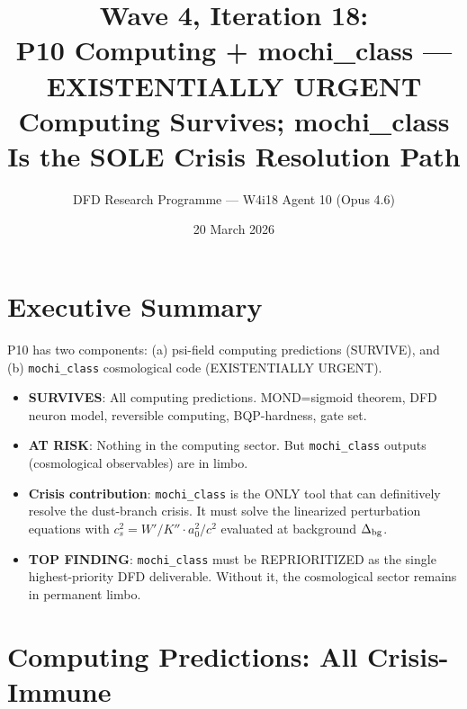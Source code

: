 \documentclass[11pt]{article}
\title{\textbf{Wave 4, Iteration 18:}\\
\textbf{P10 Computing + mochi\_class --- EXISTENTIALLY URGENT}\\[6pt]
{\large Computing Survives; mochi\_class Is the SOLE Crisis Resolution Path}}
\author{DFD Research Programme --- W4i18 Agent 10 (Opus 4.6)}
\date{20 March 2026}
\begin{document}
\maketitle

\section*{Executive Summary}

\begin{tcolorbox}[colback=red!5!white, colframe=red!70!black,
  title=\textbf{W4i18: P10 COMPUTING SURVIVES --- mochi\_class EXISTENTIALLY URGENT}]

P10 has two components: (a) psi-field computing predictions (SURVIVE),
and (b) \texttt{mochi\_class} cosmological code (EXISTENTIALLY URGENT).

\begin{itemize}
\item \textbf{SURVIVES}: All computing predictions. MOND=sigmoid theorem,
  DFD neuron model, reversible computing, BQP-hardness, gate set.
\item \textbf{AT RISK}: Nothing in the computing sector. But
  \texttt{mochi\_class} outputs (cosmological observables) are in limbo.
\item \textbf{Crisis contribution}: \texttt{mochi\_class} is the ONLY
  tool that can definitively resolve the dust-branch crisis. It must
  solve the linearized perturbation equations with $c_s^2 = W'/K''
  \cdot a_0^2/c^2$ evaluated at background $\Delta_{\rm bg}$.
\item \textbf{TOP FINDING}: \texttt{mochi\_class} must be REPRIORITIZED
  as the single highest-priority DFD deliverable. Without it, the
  cosmological sector remains in permanent limbo.
\end{itemize}
\end{tcolorbox}

\section{Computing Predictions: All Crisis-Immune}
\end{document}
